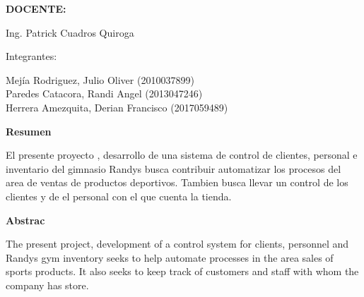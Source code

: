 \documentclass[12pt,letterpaper]{article}
\begin{document}
\begin{titlepage}
\begin{center}
\vspace*{0.3in}
\begin{Large}
\textbf{DOCENTE:} \\
\end{Large}

\vspace*{0.1in}
\begin{large}
Ing. Patrick Cuadros Quiroga\\
\end{large}

\vspace*{0.2in}
\vspace*{0.1in}
\begin{large}
Integrantes: \\
\begin{flushleft}

Mej\'ia Rodriguez, Julio Oliver         	\hfill	(2010037899) \\
Paredes Catacora, Randi Angel   	\hfill	(2013047246) \\

Herrera Amezquita, Derian Francisco		\hfill	(2017059489) \\

\end{flushleft}
\end{large}
\end{center}

\end{titlepage}



\tableofcontents %
\thispagestyle{empty} %
\newpage
\setcounter{page}{1} %


\begin{center}
    \textbf{\Large Resumen}  
\end{center}

El presente proyecto , desarrollo de una sistema de control de clientes, personal e
inventario del gimnasio Randys busca  contribuir automatizar los procesos del area 
de ventas de productos deportivos.
Tambien busca llevar un control de los clientes y de el personal con el que cuenta la 
tienda. 
\\
\begin{center}
    \textbf{\Large Abstrac}
\end{center}

The present project, development of a control system for clients, personnel and
Randys gym inventory seeks to help automate processes in the area
sales of sports products.
It also seeks to keep track of customers and staff with whom the company has
store.
\end{document}
